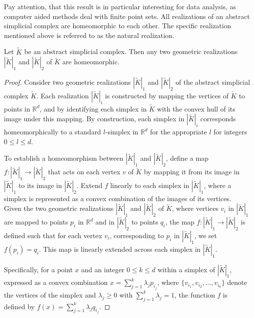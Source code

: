 Pay attention, that this result is in particular interesting for data analysis, as computer aided methods deal with finite point sets. All realizations of an abstract simplicial complex are homeomorphic to each other.
The specific realization mentioned above is referred to as the natural
realization.

\begin{proposition}
	Let $\tilde{K}$ be an abstract simplicial complex. Then any two geometric
	realizations $|\tilde{K}|_{1}$ and $|\tilde{K}|_{2}$ of $\tilde{K}$ are
	homeomorphic.
\end{proposition}

\begin{proof}
	Consider two geometric realizations $|\tilde{K}|_{1}$ and $|\tilde{K}|_{2}$ of
	the abstract simplicial complex $\tilde{K}$. Each realization
	$|\tilde{K}|_{i}$ is constructed by mapping the vertices of $\tilde{K}$ to
	points in $\mathbb{R}^{d}$, and by identifying each simplex in $\tilde{K}$ with
	the convex hull of its image under this mapping. By construction, each simplex
	in $|\tilde{K}|_{i}$ corresponds homeomorphically to a standard $l$-simplex in
	$\mathbb{R}^{d}$ for the appropriate $l$ for integers $0 \leq l \leq d$.

	To establish a homeomorphism between $|\tilde{K}|_{1}$ and $|\tilde{K}|_{2}$,
	define a map $f: |\tilde{K}|_{1} \to |\tilde{K}|_{2}$ that acts on each vertex
	$v$ of $\tilde{K}$ by mapping it from its image in $|\tilde{K}|_{1}$ to its
	image in $|\tilde{K}|_{2}$. Extend $f$ linearly to each simplex in $|\tilde{K}|
	_{1}$, where a simplex is represented as a convex combination of the images of
	its vertices. Given the two geometric realizations $|\tilde{K}|_{1}$ and $|\tilde{K}|_{2}$
	of $\tilde{K}$, where vertices $v_{i}$ in $|\tilde{K}|_{1}$ are mapped to points
	$p_{i}$ in $\mathbb{R}^{d}$ and in $|\tilde{K}|_{2}$ to points $q_{i}$, the
	map $f: |\tilde{K}|_{1} \to |\tilde{K}|_{2}$ is defined such that for each
	vertex $v_{i}$, corresponding to $p_{i}$ in $|\tilde{K}|_{1}$, we set
	$f(p_{i}) = q_{i}$. This map is linearly extended across each simplex in $|\tilde
	{K}|_{1}$.

	Specifically, for a point $x$ and an integer $0 \leq k \leq d$ within a simplex of $|\tilde{K}|_{1}$, expressed
	as a convex combination $x = \sum_{j=1}^{k}\lambda_{j} p_{i_j}$,
	where $\{v_{i_1}, v_{i_2}, \ldots, v_{i_k}\}$ denote the vertices of the simplex
	and $\lambda_{j} \geq 0$ with $\sum_{j=1}^{k}\lambda_{j} = 1$, the function
	$f$ is defined by $f(x) = \sum_{j=1}^{k}\lambda_{j} q_{i_j}$.
	

\end{proof}
